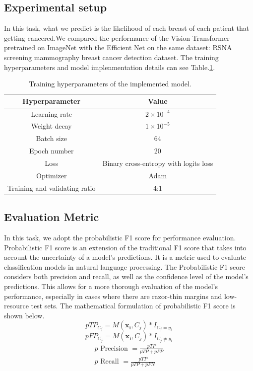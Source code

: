 \documentclass{article}
\begin{document}
\subsection{Experimental setup}
In this task, what we predict is the likelihood of each breast of each patient that getting cancered.We compared the performance of the Vision Transformer pretrained on ImageNet\cite{deng2009imagenet} with the Efficient Net on the same dataset: RSNA screening mammography breast cancer detection dataset. The training hyperparameters and model implenmentation details can see Table.\ref{table:training_hyperparameters}. 
\begin{table}[h!]
\centering
\begin{tabular}{ |c|c| }
\hline
Hyperparameter & Value \\
\hline
Learning rate & $2\times10^{-4}$ \\
Weight decay & $1\times10^{-5}$ \\
Batch size & 64 \\
Epoch number & 20 \\
Loss  &Binary cross-entropy with logits loss \\
Optimizer & Adam\\
Training and validating ratio & 4:1\\
\hline
\end{tabular}
\caption{Training hyperparameters of the implemented model.  }
\label{table:training_hyperparameters}
\end{table}

\subsection{Evaluation Metric}
In this task, we adopt the probabilistic F1 score \cite{yacouby2020probabilistic} for performance evaluation. Probabilistic F1 score is an extension of the traditional F1 score that takes into account the uncertainty of a model's predictions. It is a metric used to evaluate classification models in natural language processing. The Probabilistic F1 score considers both precision and recall, as well as the confidence level of the model's predictions. This allows for a more thorough evaluation of the model's performance, especially in cases where there are razor-thin margins and low-resource test sets.
The mathematical formulation of probabilistic F1 score is shown below.
\begin{equation}
p T P_{C_j}=M\left(\mathbf{x}_{\mathbf{i}}, C_j\right) * I_{C_j=y_i}
\end{equation}
\begin{equation}
p F P_{C_j}=M\left(\mathbf{x}_{\mathbf{i}}, C_j\right) * I_{C_j \neq y_i}
\end{equation}
\begin{equation}
\begin{gathered}
p \text { Precision }=\frac{p T P}{p T P+p F P} \\
p \text { Recall }=\frac{p T P}{p T P+p F N}
\end{gathered}
\end{equation}
\end{document}
